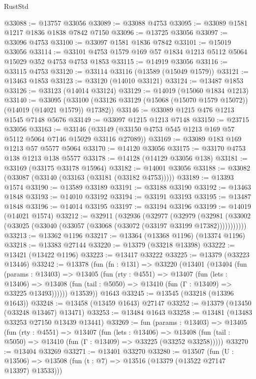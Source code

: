 \begin{lexlean}{RustStd}
\begin{coremodule}
@33088 := @13757 @33056
@33089 := @33088 @4753
@33095 := @33089 @1581 @1217 @1836 @1838 @7842 @7150
@33096 := @13725 @33056
@33097 := @33096 @4753
@33100 := @33097 @1581 @1836 @7842
@33101 := @15019 @33056
@33114 := @33101 @4753 @1579 @169 @57 @1834 @1213 @5112 @5064 @15029 @352 @4753 @4753 @1853
@33115 := @14919 @33056
@33116 := @33115 @4753
@33120 := @33114 @33116 (@13589 (@15049 @1579))
@33121 := @13463 @1853
@33123 := @33120 (@14010 @33121)
@33124 := @13487 @1853
@33126 := @33123 (@14014 @33124)
@33129 := @14019 (@15060 @1834 @1213)
@33140 := @33095
    (@33100 (@33126 @33129 (@15068 (@15070 @1579 @15072)) (@14019 (@14021 @1579)) @17382))
@33146 := @33089 @1215 @476 @1213 @1545 @7148 @5676
@33149 := @33097 @1215 @1213 @7148
@33150 := @23715 @33056
@33163 := @33146 (@33149 (@33150 @4753 @545 @1213 @169 @57 @5112 @5064 @7146 @15029 @33116 @27089))
@33169 := @33089 @183 @169 @1213 @57 @5577 @5064
@33170 := @14120 @33056
@33175 := @33170 @4753 @138 @1213 @138 @5577
@33178 := @14128 (@14129 @33056 @138)
@33181 := @33169 (@33175 @33178 @15964)
@33182 := @14001 @33056
@33188 := @33082 (@33087 (@33140 (@33163 (@33181 (@33182 @4753)))))
@33189 := @13393 @1574
@33190 := @13589 @33189
@33191 := @33188 @33190
@33192 := @13463 @1848
@33193 := @14010 @33192
@33194 := @33191 @33193
@33195 := @13487 @1848
@33196 := @14014 @33195
@33197 := @33194 @33196
@33199 := @14019 (@14021 @1574)
@33212 := @32911
    (@32936
      (@32977
        (@32979
          (@32981 (@33002 (@33025 (@33040 (@33057 (@33068 (@33072 (@33197 @33199 @17382)))))))))))
@33213 := @13362 @1196
@33217 := @13364 (@13368 @1196) (@13374 @1196)
@33218 := @13383 @27144
@33220 := @13379 (@33218 @13398)
@33222 := @13421 (@13422 @1196)
@33223 := @13417 @33222
@33225 := @13379 (@33223 @13446)
@33242 := @13378
    (fun (fn : @131) =>
    @33220
      (@13401
        (@13404
          (fun (params : @13403) =>
          @13405
            (fun (rty : @4551) =>
            @13407
              (fun (lets : @13406) =>
              @13408 (fun (tail : @5050) => @13410 (fun (Γ : @13409) => @33225 @13493))))))
        @13539))
    @1643
@33245 := @13545 (@33218 (@13396 @1643))
@33248 := @13458 (@13459 @1643) @27147
@33252 := @13379 (@13450 (@33248 @13467) @13471)
@33253 := @13484 @1643
@33258 := @13481 (@13483 @33253 @27150 @13439 @13441)
@33269 := fun (params : @13403) =>
  @13405
    (fun (rty : @4551) =>
    @13407
      (fun (lets : @13406) =>
      @13408 (fun (tail : @5050) => @13410 (fun (Γ : @13409) => @33225 (@33252 @33258)))))
@33270 := @13404 @33269
@33271 := @13401 @33270
@33280 := @13507
    (fun (U : @13506) => @13508 (fun (t : @7) => @13516 (@13379 (@13522 @27147 @13397) @13533)))

\end{coremodule}
\end{lexlean}

